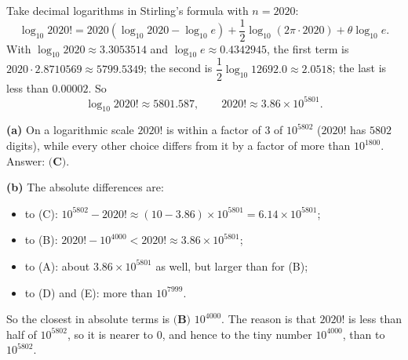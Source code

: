 Take decimal logarithms in Stirling's formula with $n=2020$:
\[\log_{10}2020!=2020\left(\log_{10}2020-\log_{10}e\right)+\dfrac12\log_{10}(2\pi\cdot2020)+\theta\log_{10}e.\]
With $\log_{10}2020\approx3.3053514$ and $\log_{10}e\approx0.4342945$, the first term is $2020\cdot2.8710569\approx5799.5349$; the second is $\dfrac12\log_{10}12692.0\approx2.0518$; the last is less than $0.00002$. So
\[\log_{10}2020!\approx5801.587,\qquad 2020!\approx3.86\times10^{5801}.\]

\textbf{(a)} On a logarithmic scale $2020!$ is within a factor of $3$ of $10^{5802}$ ($2020!$ has $5802$ digits), while every other choice differs from it by a factor of more than $10^{1800}$. Answer: $\boxed{\textbf{(C)}}$.

\textbf{(b)} The absolute differences are:
\begin{itemize}
\item to (C): $10^{5802}-2020!\approx(10-3.86)\times10^{5801}=6.14\times10^{5801}$;
\item to (B): $2020!-10^{4000}<2020!\approx3.86\times10^{5801}$;
\item to (A): about $3.86\times10^{5801}$ as well, but larger than for (B);
\item to (D) and (E): more than $10^{7999}$.
\end{itemize}
So the closest in absolute terms is $\boxed{\textbf{(B) }10^{4000}}$. The reason is that $2020!$ is less than half of $10^{5802}$, so it is nearer to $0$, and hence to the tiny number $10^{4000}$, than to $10^{5802}$.
